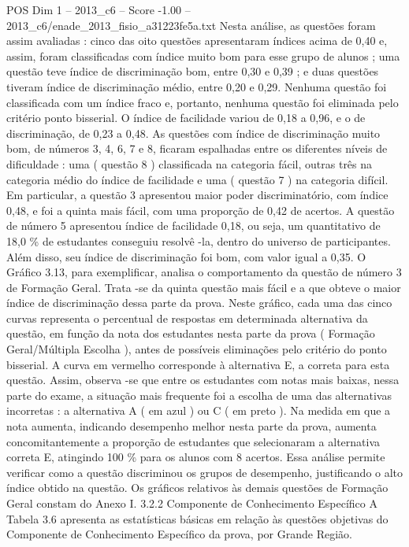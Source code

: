 \begin{textsample}{POS Dim 1 – 2013\_c6 – Score -1.00 – 2013\_c6/enade\_2013\_fisio\_a31223fe5a.txt}
Nesta análise, as questões foram assim avaliadas : cinco das oito questões apresentaram índices acima de 0,40 e, assim, foram classificadas com índice muito bom para esse grupo de alunos ; uma questão teve índice de discriminação bom, entre 0,30 e 0,39 ; e duas questões tiveram índice de discriminação médio, entre 0,20 e 0,29.
Nenhuma questão foi classificada com um índice fraco e, portanto, nenhuma questão foi eliminada pelo critério ponto bisserial.
O índice de facilidade variou de 0,18 a 0,96, e o de discriminação, de 0,23 a 0,48.
As questões com índice de discriminação muito bom, de números 3, 4, 6, 7 e 8, ficaram espalhadas entre os diferentes níveis de dificuldade : uma ( questão 8 ) classificada na categoria fácil, outras três na categoria médio do índice de facilidade e uma ( questão 7 ) na categoria difícil.
Em particular, a questão 3 apresentou maior poder discriminatório, com índice 0,48, e foi a quinta mais fácil, com uma proporção de 0,42 de acertos.
A questão de número 5 apresentou índice de facilidade 0,18, ou seja, um quantitativo de 18,0 \% de estudantes conseguiu resolvê -la, dentro do universo de participantes.
Além disso, seu índice de discriminação foi bom, com valor igual a 0,35.
O Gráfico 3.13, para exemplificar, analisa o comportamento da questão de número 3 de Formação Geral.
Trata -se da quinta questão mais fácil e a que obteve o maior índice de discriminação dessa parte da prova.
Neste gráfico, cada uma das cinco curvas representa o percentual de respostas em determinada alternativa da questão, em função da nota dos estudantes nesta parte da prova ( Formação Geral/Múltipla Escolha ), antes de possíveis eliminações pelo critério do ponto bisserial.
A curva em vermelho corresponde à alternativa E, a correta para esta questão.
Assim, observa -se que entre os estudantes com notas mais baixas, nessa parte do exame, a situação mais frequente foi a escolha de uma das alternativas incorretas : a alternativa A ( em azul ) ou C ( em preto ).
Na medida em que a nota aumenta, indicando desempenho melhor nesta parte da prova, aumenta concomitantemente a proporção de estudantes que selecionaram a alternativa correta E, atingindo 100 \% para os alunos com 8 acertos.
Essa análise permite verificar como a questão discriminou os grupos de desempenho, justificando o alto índice obtido na questão.
Os gráficos relativos às demais questões de Formação Geral constam do Anexo I. 3.2.2 Componente de Conhecimento Específico A Tabela 3.6 apresenta as estatísticas básicas em relação às questões objetivas do Componente de Conhecimento Específico da prova, por Grande Região.

\end{textsample}
